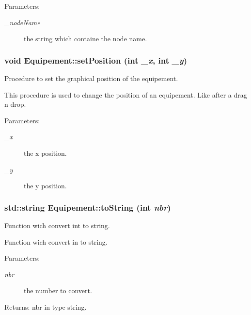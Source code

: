 \begin{Desc}
\item[Parameters:]
\begin{description}
\item[{\em \_\-nodeName}]the string which containe the node name. \end{description}
\end{Desc}
\hypertarget{class_equipement_70bc8e8f1b9527a9c54f4ac6bd93a2c7}{
\subsubsection[{setPosition}]{\setlength{\rightskip}{0pt plus 5cm}void Equipement::setPosition (int {\em \_\-x}, \/  int {\em \_\-y})}}
\label{class_equipement_70bc8e8f1b9527a9c54f4ac6bd93a2c7}


Procedure to set the graphical position of the equipement. 

This procedure is used to change the position of an equipement. Like after a drag n drop.

\begin{Desc}
\item[Parameters:]
\begin{description}
\item[{\em \_\-x}]the x position. \item[{\em \_\-y}]the y position. \end{description}
\end{Desc}
\hypertarget{class_equipement_e6b65817f2f2d1f93669475530d849ca}{
\subsubsection[{toString}]{\setlength{\rightskip}{0pt plus 5cm}std::string Equipement::toString (int {\em nbr})}}
\label{class_equipement_e6b65817f2f2d1f93669475530d849ca}


Function wich convert int to string. 

Function wich convert in to string.

\begin{Desc}
\item[Parameters:]
\begin{description}
\item[{\em nbr}]the number to convert. \end{description}
\end{Desc}
\begin{Desc}
\item[Returns:]nbr in type string. \end{Desc}


